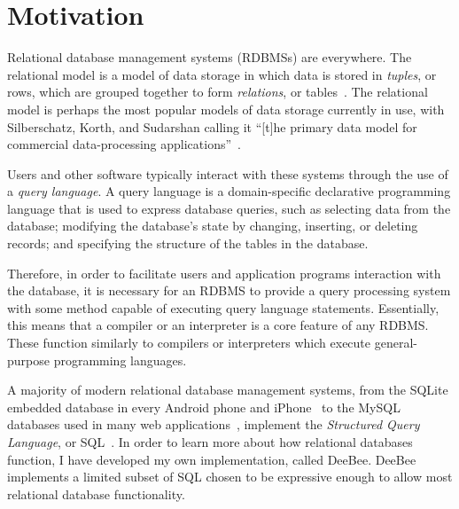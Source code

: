 
\graphicspath{{assets/figures/}}
\usepackage{minted}

\renewcommand\listoflistingscaption{List of Listings}


\MYHEADERS{}
\PLEDGE{}
\tableofcontents
\listoflistings
\vfill
\pagebreak
\section{Motivation}

Relational database management systems (RDBMSs) are everywhere. The relational model is a model of data storage in which data is stored in \textit{tuples}, or rows, which are grouped together to form \textit{relations}, or tables~\cite{silberschatz2010database,harrington2009relational,garcia2000database}. The relational model is perhaps the most popular models of data storage currently in use, with Silberschatz, Korth, and Sudarshan calling it ``[t]he primary data model for commercial data-processing applications''~\cite[page 39]{silberschatz2010database}.

Users and other software typically interact with these systems through the use of a \textit{query language}. A query language is a domain-specific declarative programming language that is used to express database queries, such as selecting data from the database; modifying the database's state by changing, inserting, or deleting records; and specifying the structure of the tables in the database. 

Therefore, in order to facilitate users and application programs interaction with the database, it is necessary for an RDBMS to provide a query processing system with some method capable of executing query language statements. Essentially, this means that a compiler or an interpreter is a core feature of any RDBMS. These function similarly to compilers or interpreters which execute general-purpose programming languages.

A majority of modern relational database management systems, from the SQLite embedded database in every Android phone and iPhone~\cite{sqliteFamous} to the MySQL databases used in many web applications~\cite{onLamp}, implement the \textit{Structured Query Language}, or SQL~\cite{silberschatz2010database}. In order to learn more about how relational databases function, I have developed my own implementation, called DeeBee. DeeBee implements a limited subset of SQL chosen to be expressive enough to allow most relational database functionality. 

